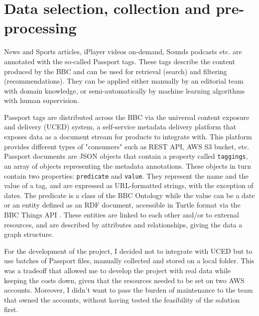 
\section{Data selection, collection and pre-processing}


News and Sports articles, iPlayer videos on-demand, Sounds podcasts etc. are annotated with the so-called Passport tags.
These tags describe the content produced by the BBC and can be used for retrieval (search) and filtering (recommendations).
They can be applied either manually by an editorial team with domain knowledge,
or semi-automatically by machine learning algorithms with human supervision.

Passport tags are distributed across the BBC via the universal content exposure and delivery (UCED) system,
a self-service metadata delivery platform that exposes data as a document stream for products to integrate with.
This platform provides different types of "consumers" such as REST API, AWS S3 bucket, etc.
Passport documents are JSON objects that contain a property called \verb|taggings|, an array of objects representing the
metadata annotations. These objects in turn contain two properties: \verb|predicate| and \verb|value|. They represent the name and the value of
a tag, and are expressed as URL-formatted strings, with the exception of dates. The predicate is a class of the BBC Ontology \cite{BBC:Ontologies}
while the value can be a date or an entity defined as an RDF \cite{W3C:RDF,W3C:RDF:Concepts} document,
accessible in Turtle format \cite{W3C:Turtle} via the BBC Things API \cite{BBC:Things,BBC:Things:About,BBC:Things:API}.
These entities are linked to each other and/or to external resources, and are described by attributes and relationships, giving the
data a graph structure.


For the development of the project, I decided not to integrate with UCED but to use batches of Passport files, manually collected and stored
on a local folder.
This was a tradeoff that allowed me to develop the project with real data while keeping the costs down, given that the resources needed to
be set on two AWS accounts. Moreover, I didn't want to pass the burden of maintenance to the team that owned the accounts, without having tested
the feasibility of the solution first.

